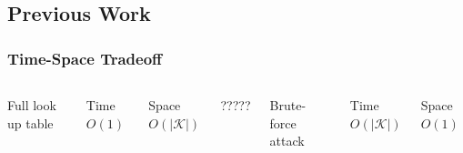 \documentclass{beamer}
\begin{document}
\subsection{Previous Work}
\begin{frame}
\frametitle{Time-Space Tradeoff}



\begin{columns}[c] %
Full look up table \\
\begin{block}{Time}
$O(1)$
\end{block}

\begin{block}{Space}
$O(\lvert \mathcal{K} \rvert)$
\end{block}
?????


Brute-force attack \\
\begin{block}{Time}
$O(\lvert \mathcal{K} \rvert)$
\end{block}

\begin{block}{Space}
$O(1)$
\end{block}

\end{columns}


\end{frame}
\end{document}
